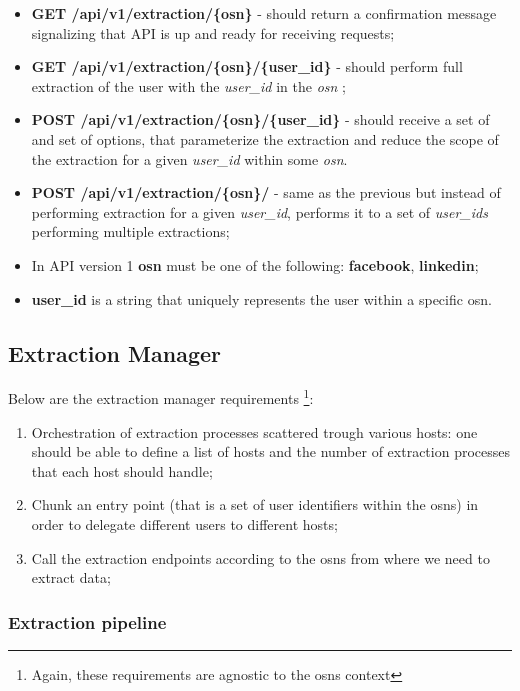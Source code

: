 \begin{enumerate}
\begin{itemize}
        \item \textbf{GET /api/v1/extraction/\{osn\}} - should return a confirmation message signalizing that API is up and ready for receiving requests;
        \item \textbf{GET /api/v1/extraction/\{osn\}/\{user\_id\}} - should perform full extraction of the user with the \textit{user\_id} in the \textit{osn} ;
        \item \textbf{POST /api/v1/extraction/\{osn\}/\{user\_id\}} - should receive a set of and set of options, that parameterize the extraction and reduce the scope of the extraction for a given \textit{user\_id} within some \textit{osn}.
        \item \textbf{POST /api/v1/extraction/\{osn\}/} - same as the previous but instead of performing extraction for a given \textit{user\_id}, performs it to a set of \textit{user\_ids} performing multiple extractions;
        \item In API version 1 \textbf{osn} must be one of the following: \textbf{facebook}, \textbf{linkedin};
        \item \textbf{user\_id} is a string that uniquely represents the user within a specific \gls{osn}.
    \end{itemize}
\end{enumerate}

\subsection{Extraction Manager}
Below are the extraction manager requirements \footnote{Again, these requirements are agnostic to the \glspl{osn} context}:

\begin{enumerate}
    \item Orchestration of extraction processes scattered trough various hosts: one should be able to define a list of hosts and the number of extraction processes that each host should handle;
    \item Chunk an entry point (that is a set of user identifiers within the \glspl{osn}) in order to delegate different users to different hosts;
    \item Call the extraction endpoints according to the \glspl{osn} from where we need to extract data;
\end{enumerate}

\subsubsection{Extraction pipeline}

